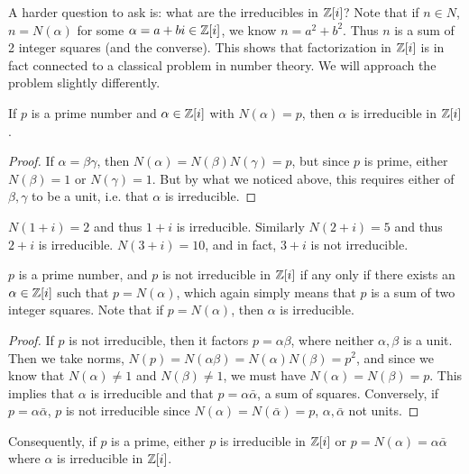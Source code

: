 \documentclass{../mathnotes}
\begin{document}
A harder question to ask is: what are the irreducibles in $\mathbb{Z}[i]$? Note that if $n\in N$, $n=N(\alpha)$ for some $\alpha=a+bi\in\mathbb{Z}[i]$,
we know $n=a^2+b^2$. Thus $n$ is a sum of 2 integer squares (and the converse). This shows that factorization in $\mathbb{Z}[i]$ is in fact connected
to a classical problem in number theory. We will approach the problem slightly differently.
\begin{lem}
    If $p$ is a prime number and $\alpha\in\mathbb{Z}[i]$ with $N(\alpha)=p$, then $\alpha$ is irreducible in $\mathbb{Z}[i]$.   
\end{lem}
\begin{proof}
    If $\alpha=\beta\gamma$, then $N(\alpha)=N(\beta)N(\gamma)=p$, but since $p$ is prime, either $N(\beta)=1$ or $N(\gamma)=1$. But
    by what we noticed above, this requires either of $\beta,\gamma$ to be a unit, i.e. that $\alpha$ is irreducible.
\end{proof}

\begin{exmp}
    $N(1+i)=2$ and thus $1+i$ is irreducible. Similarly $N(2+i)=5$ and thus $2+i$ is irreducible. $N(3+i)=10$, and in fact, $3+i$
    is not irreducible.
\end{exmp}

\begin{lem}
    $p$ is a prime number, and $p$ is not irreducible in $\mathbb{Z}[i]$ if any only if there exists an $\alpha\in\mathbb{Z}[i]$ such that $p=N(\alpha)$,
    which again simply means that $p$ is a sum of two integer squares. Note that if $p=N(\alpha)$, then $\alpha$ is irreducible.
\end{lem}
\begin{proof}
    If $p$ is not irreducible, then it factors $p=\alpha\beta$, where neither $\alpha,\beta$ is a unit. Then we take norms,
    $N(p)=N(\alpha\beta)=N(\alpha)N(\beta)=p^2$, and since we know that $N(\alpha)\neq 1$ and $N(\beta)\neq 1$, we must have
    $N(\alpha)=N(\beta)=p$. This implies that $\alpha$ is irreducible and that $p=\alpha\bar\alpha$, a sum of squares. Conversely,
    if $p=\alpha\bar\alpha$, $p$ is not irreducible since $N(\alpha)=N(\bar\alpha)=p$, $\alpha,\bar\alpha$ not units.
\end{proof}

Consequently, if $p$ is a prime, either $p$ is irreducible in $\mathbb{Z}[i]$ or $p=N(\alpha)=\alpha\bar\alpha$ where $\alpha$ is irreducible in $\mathbb{Z}[i]$.
\end{document}
